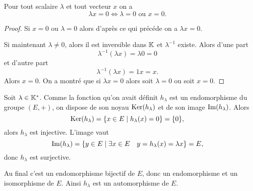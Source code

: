 \begin{prop}
  Pour tout scalaire $\lambda$ et tout vecteur $x$ on a
  \begin{equation}
    \lambda x = 0 \iff \lambda = 0 \text{~ou~} x=0.
  \end{equation}
\end{prop}
\begin{proof}
  Si $x=0$ ou $\lambda=0$ alors d'après ce qui précéde on a $\lambda x=0$.

  Si maintenant $\lambda \neq 0$, alors il est inversible dans $\mathbb{K}$ et $\lambda^{-1}$ existe. Alors d'une part
  \begin{equation}
    \lambda^{-1}(\lambda x)=\lambda 0 =0
  \end{equation}
  et d'autre part
  \begin{equation}
    \lambda^{-1}(\lambda x)=1 x=x.
  \end{equation}
  Alors $x=0$. On a montré que si $\lambda x=0$ alors soit $\lambda=0$ ou soit $x=0$.
\end{proof}

Soit $\lambda \in \mathbb{K}^*$. Comme la fonction qu'on avait définit $h_\lambda$ est un endomorphisme du groupe $(E,+)$, on dispose de son noyau $\operatorname{Ker}(h_\lambda)$ et de son image $\operatorname{Im}(h_\lambda)$. Alors
\begin{equation}
  \operatorname{Ker}(h_\lambda)=\left\{x \in E\mathrel{}\middle|\mathrel{}h_\lambda(x)=0\right\}=\{0\},
\end{equation}
alors $h_\lambda$ est injective. L'image vaut
\begin{equation}
  \operatorname{Im}(h_\lambda)=\left\{y \in E\mathrel{}\middle|\mathrel{}\exists x \in E \quad y=h_\lambda(x)=\lambda x\right\} = E,
\end{equation}
donc $h_\lambda$ est surjective.

Au final c'est un endomorphisme bijectif de $E$, donc un endomorphisme et un isomorphisme de $E$. Ainsi $h_\lambda$ est un automorphisme de $E$.

